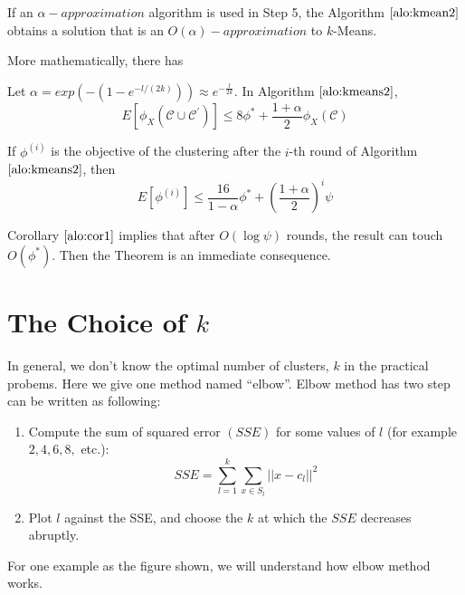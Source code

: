           \begin{theorem}
          \label{alo:the}
	 If an $\alpha-approximation$ algorithm is used in Step 5, the Algorithm $\ref{alo:kmean2}$ obtains a solution that is an $O(\alpha)-approximation$ to $k$-Means.
	 \end{theorem}
	 
	 More mathematically, there has 
	  \begin{theorem}
	 Let $\alpha = exp(-(1- e^{-l/(2k)})) \approx e^{-\frac{l}{2k}}$. In Algorithm $\ref{alo:kmeans2}$, 
	 \begin{equation}
	 E[\phi_{X}(\mathcal{C}\cup \mathcal{C}^{'})] \leq 8 \phi^{*} + \frac{1+\alpha}{2} \phi_{X}(\mathcal{C})
	 \end{equation}
	 \end{theorem}
	 
	 \begin{corollary}\label{alo:cor1}
	If $\phi^{(i)}$ is the objective of the clustering after the $i$-th round of Algorithm $\ref{alo:kmeans2}$, then 
	\begin{equation}
	 E[\phi^{(i)}] \leq \frac{16}{1 - \alpha} \phi^{*} + \left(\frac{1+\alpha}{2}\right)^{i} \psi
	 \end{equation}
	 \end{corollary}
	 Corollary $\ref{alo:cor1}$ implies that after $O(\log \psi)$ rounds, the result can touch $O(\phi^{*})$. Then the Theorem is an immediate consequence.
	 
\section{The Choice of $k$}
         In general, we don't know the optimal number of clusters, $k$ in the practical probems. Here we give one method named ``elbow''.
         Elbow method has two step can be written as following:
         \begin{enumerate}
         \item Compute the sum of squared error $(SSE)$ for some values of $l$ (for example $2, 4, 6, 8,$ etc.):
         \begin{equation}
         SSE={\sum_{l=1}^{k}\sum_{x \in S_{l}}} ||x-c_{l}||^{2}
         \end{equation}
         \item Plot $l$ against the SSE, and choose the $k$ at which the $SSE$ decreases abruptly.
\end{enumerate}

         For one example as the figure shown, we will understand how elbow method works.

